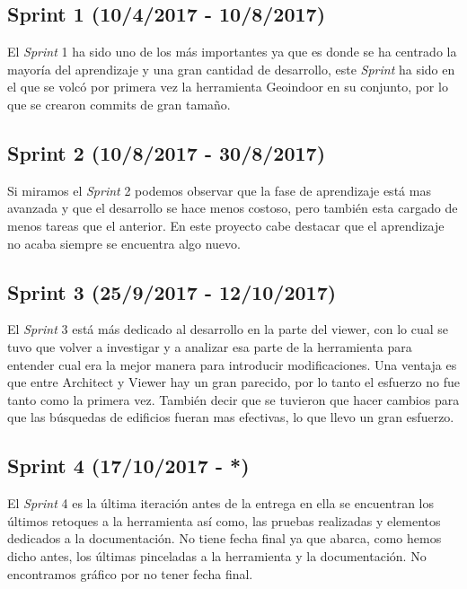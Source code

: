 \subsection{Sprint 1 (10/4/2017 - 10/8/2017)}\label{splrint1}
El \emph{Sprint} 1 ha sido uno de los más importantes ya que es donde se ha centrado la mayoría del aprendizaje y una gran cantidad de desarrollo, este \emph{Sprint} ha sido en el que se volcó por primera vez la herramienta Geoindoor en su conjunto, por lo que se crearon commits de gran tamaño.


\subsection{Sprint 2 (10/8/2017 - 30/8/2017)}\label{splrint2}
Si miramos el \emph{Sprint} 2 podemos observar que la fase de aprendizaje está mas avanzada y que el desarrollo se hace menos costoso, pero también esta cargado de menos tareas que el anterior. En este proyecto cabe destacar que el aprendizaje no acaba siempre se encuentra algo nuevo.


\subsection{Sprint 3 (25/9/2017 - 12/10/2017)}\label{splrint3}
El \emph{Sprint} 3 está más dedicado al desarrollo en la parte del viewer, con lo cual se tuvo que volver a investigar y a analizar esa parte de la herramienta para entender cual era la mejor manera para introducir modificaciones. Una ventaja es que entre Architect y Viewer hay un gran parecido, por lo tanto el esfuerzo no fue tanto como la primera vez. También decir que se tuvieron que hacer cambios para que las búsquedas de edificios fueran mas efectivas, lo que llevo un gran esfuerzo.


\subsection{Sprint 4 (17/10/2017 - *)}\label{splrint3}
El \emph{Sprint} 4 es la última iteración antes de la entrega en ella se encuentran los últimos retoques a la herramienta así como, las pruebas realizadas y elementos dedicados a la documentación.
No tiene fecha final ya que abarca, como hemos dicho antes, los últimas pinceladas a la herramienta y la documentación. No encontramos gráfico por no tener fecha final.
 
